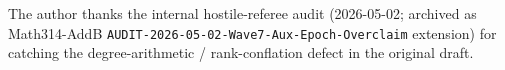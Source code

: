 \begin{acknowledgments}
The author thanks the internal hostile-referee audit (2026-05-02;
archived as Math314-AddB
\texttt{AUDIT-2026-05-02-Wave7-Aux-Epoch-Overclaim} extension) for
catching the degree-arithmetic / rank-conflation defect in the
original draft.
\end{acknowledgments}





